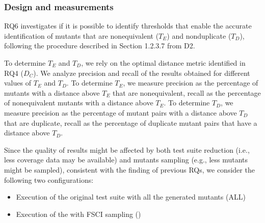 \subsubsection{Design and measurements}
RQ6 investigates if it is possible to identify thresholds that enable the accurate identification of mutants that are nonequivalent ($T_E$) and nonduplicate ($T_D$), following the procedure described in Section 1.2.3.7 from D2.

To determine $T_E$ and $T_D$, 
we rely on the optimal distance metric identified in RQ4 ($D_C$).
We analyze  precision and recall of the results obtained for  different values of $T_E$ and $T_D$.
To determine $T_E$, we measure
precision as the percentage of mutants with a distance above $T_E$ that are nonequivalent, recall as the percentage of nonequivalent mutants with a distance above $T_E$.
To determine $T_D$, we measure
precision as the percentage of mutant pairs with a distance above $T_D$ that are duplicate, recall as the percentage of duplicate mutant pairs that have a distance above $T_D$.

Since the quality of results might be affected by both test suite reduction (i.e., less coverage data may be available) and mutants sampling (e.g., less mutants might be sampled), consistent with the finding of previous RQs, we consider the following two configurations: 
\begin{itemize}
\item Execution of the original test suite with all the generated mutants (ALL)
\item Execution of the \MPTS with FSCI sampling (\APPR)
\end{itemize}

